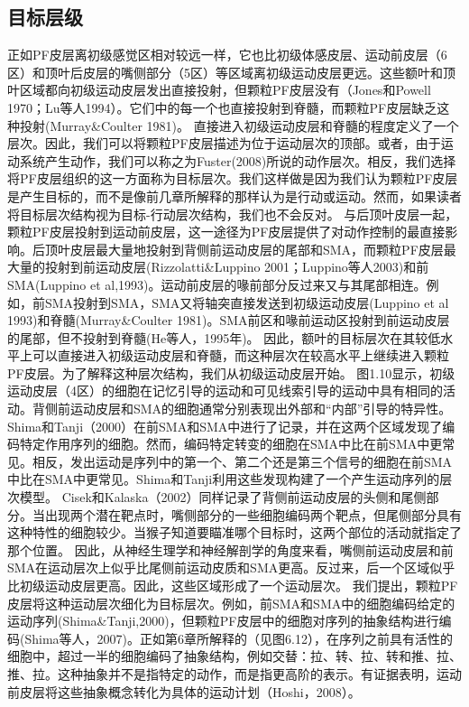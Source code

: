 \subsection{目标层级}
\par
正如PF皮层离初级感觉区相对较远一样，它也比初级体感皮层、运动前皮层（6区）和顶叶后皮层的嘴侧部分（5区）等区域离初级运动皮层更远。这些额叶和顶叶区域都向初级运动皮层发出直接投射，但颗粒PF皮层没有（Jones和Powell 1970；Lu等人1994）。它们中的每一个也直接投射到脊髓，而颗粒PF皮层缺乏这种投射(Murray\&Coulter 1981)。
直接进入初级运动皮层和脊髓的程度定义了一个层次。因此，我们可以将颗粒PF皮层描述为位于运动层次的顶部。或者，由于运动系统产生动作，我们可以称之为Fuster(2008)所说的动作层次。相反，我们选择将PF皮层组织的这一方面称为目标层次。我们这样做是因为我们认为颗粒PF皮层是产生目标的，而不是像前几章所解释的那样认为是行动或运动。然而，如果读者将目标层次结构视为目标-行动层次结构，我们也不会反对。
与后顶叶皮层一起，颗粒PF皮层投射到运动前皮层，这一途径为PF皮层提供了对动作控制的最直接影响。后顶叶皮层最大量地投射到背侧前运动皮层的尾部和SMA，而颗粒PF皮层最大量的投射到前运动皮层(Rizzolatti\&Luppino 2001；Luppino等人2003)和前SMA(Luppino et al,1993)。运动前皮层的喙前部分反过来又与其尾部相连。例如，前SMA投射到SMA，SMA又将轴突直接发送到初级运动皮层(Luppino et al 1993)和脊髓(Murray\&Coulter 1981)。SMA前区和喙前运动区投射到前运动皮层的尾部，但不投射到脊髓(He等人，1995年)。
因此，额叶的目标层次在其较低水平上可以直接进入初级运动皮层和脊髓，而这种层次在较高水平上继续进入颗粒PF皮层。为了解释这种层次结构，我们从初级运动皮层开始。
图1.10显示，初级运动皮层（4区）的细胞在记忆引导的运动和可见线索引导的运动中具有相同的活动。背侧前运动皮层和SMA的细胞通常分别表现出外部和“内部”引导的特异性。
Shima和Tanji（2000）在前SMA和SMA中进行了记录，并在这两个区域发现了编码特定作用序列的细胞。然而，编码特定转变的细胞在SMA中比在前SMA中更常见。相反，发出运动是序列中的第一个、第二个还是第三个信号的细胞在前SMA中比在SMA中更常见。Shima和Tanji利用这些发现构建了一个产生运动序列的层次模型。
Cisek和Kalaska（2002）同样记录了背侧前运动皮层的头侧和尾侧部分。当出现两个潜在靶点时，嘴侧部分的一些细胞编码两个靶点，但尾侧部分具有这种特性的细胞较少。当猴子知道要瞄准哪个目标时，这两个部位的活动就指定了那个位置。
因此，从神经生理学和神经解剖学的角度来看，嘴侧前运动皮层和前SMA在运动层次上似乎比尾侧前运动皮质和SMA更高。反过来，后一个区域似乎比初级运动皮层更高。因此，这些区域形成了一个运动层次。
我们提出，颗粒PF皮层将这种运动层次细化为目标层次。例如，前SMA和SMA中的细胞编码给定的运动序列(Shima\&Tanji,2000)，但颗粒PF皮层中的细胞对序列的抽象结构进行编码(Shima等人，2007)。正如第6章所解释的（见图6.12），在序列之前具有活性的细胞中，超过一半的细胞编码了抽象结构，例如交替：拉、转、拉、转和推、拉、推、拉。这种抽象并不是指特定的动作，而是指更高阶的表示。有证据表明，运动前皮层将这些抽象概念转化为具体的运动计划（Hoshi，2008）。
